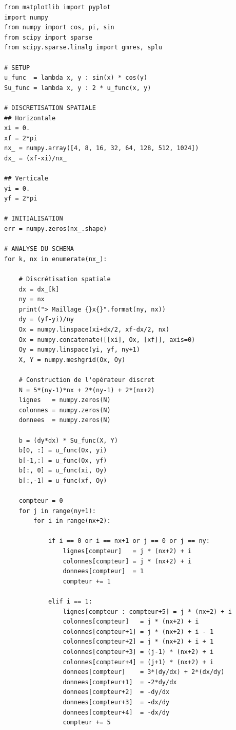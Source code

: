 \begin{verbatim}
from matplotlib import pyplot
import numpy
from numpy import cos, pi, sin
from scipy import sparse
from scipy.sparse.linalg import gmres, splu

# SETUP
u_func  = lambda x, y : sin(x) * cos(y)
Su_func = lambda x, y : 2 * u_func(x, y)

# DISCRETISATION SPATIALE
## Horizontale
xi = 0.
xf = 2*pi
nx_ = numpy.array([4, 8, 16, 32, 64, 128, 512, 1024])
dx_ = (xf-xi)/nx_

## Verticale
yi = 0.
yf = 2*pi

# INITIALISATION
err = numpy.zeros(nx_.shape)

# ANALYSE DU SCHEMA
for k, nx in enumerate(nx_):
    
    # Discrétisation spatiale
    dx = dx_[k]
    ny = nx
    print("> Maillage {}x{}".format(ny, nx))
    dy = (yf-yi)/ny
    Ox = numpy.linspace(xi+dx/2, xf-dx/2, nx)
    Ox = numpy.concatenate([[xi], Ox, [xf]], axis=0)
    Oy = numpy.linspace(yi, yf, ny+1)
    X, Y = numpy.meshgrid(Ox, Oy)
    
    # Construction de l'opérateur discret
    N = 5*(ny-1)*nx + 2*(ny-1) + 2*(nx+2)
    lignes   = numpy.zeros(N)
    colonnes = numpy.zeros(N)
    donnees  = numpy.zeros(N)
    
    b = (dy*dx) * Su_func(X, Y)
    b[0, :] = u_func(Ox, yi)
    b[-1,:] = u_func(Ox, yf)
    b[:, 0] = u_func(xi, Oy)
    b[:,-1] = u_func(xf, Oy)

    compteur = 0
    for j in range(ny+1):
        for i in range(nx+2):
                
            if i == 0 or i == nx+1 or j == 0 or j == ny:
                lignes[compteur]   = j * (nx+2) + i
                colonnes[compteur] = j * (nx+2) + i
                donnees[compteur]  = 1
                compteur += 1
   
            elif i == 1:
                lignes[compteur : compteur+5] = j * (nx+2) + i
                colonnes[compteur]   = j * (nx+2) + i
                colonnes[compteur+1] = j * (nx+2) + i - 1
                colonnes[compteur+2] = j * (nx+2) + i + 1
                colonnes[compteur+3] = (j-1) * (nx+2) + i
                colonnes[compteur+4] = (j+1) * (nx+2) + i
                donnees[compteur]    = 3*(dy/dx) + 2*(dx/dy)
                donnees[compteur+1]  = -2*dy/dx
                donnees[compteur+2]  = -dy/dx
                donnees[compteur+3]  = -dx/dy
                donnees[compteur+4]  = -dx/dy
                compteur += 5
            

\end{verbatim}
